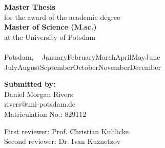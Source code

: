 \documentclass[12pt,a4paper]{article}
\makeatletter
\newcommand{\ThesisTitle}{\TITLE}
\newcommand{\AuthorName}{Daniel Morgan Rivers}
\newcommand{\AuthorAddressTwo}{Berlin, Germany 10559}
\newcommand{\AuthorEmail}{rivers@uni-potsdam.de}
\newcommand{\MatricNo}{829112}
\newcommand{\FirstReviewer}{Prof. Christian Kuhlicke}
\newcommand{\SecondReviewer}{Dr. Ivan Kuznetzov}
\newcommand{\MonthName}{%
  \ifcase\month
  \or January\or February\or March\or April\or May\or June%
  \or July\or August\or September\or October\or November\or December%
  \fi
}
\newcommand{\DateDDMonthYYYY}{\number\day~\MonthName~\number\year}
\makeatother
\begin{document}
\begin{center}
\begin{center}
        {\large \textbf{Master Thesis}}\\
        for the award of the academic degree\\
        \textbf{Master of Science (M.sc.)}\\
        at the University of Potsdam\\[3em]
    
        \textbf{\LARGE \ThesisTitle}\\ [3em] %
    
        Potsdam, \DateDDMonthYYYY \\[9em]
    
        \begin{flushleft}
            \textbf{Submitted by:}\\[-0.2em]
            \AuthorName\\
            \AuthorEmail\\
            Matriculation No.: \MatricNo

            First reviewer: \FirstReviewer\\
            Second reviewer: \SecondReviewer
        \end{flushleft}

    
    \end{center}
    \clearpage



\end{center}
\end{document}
